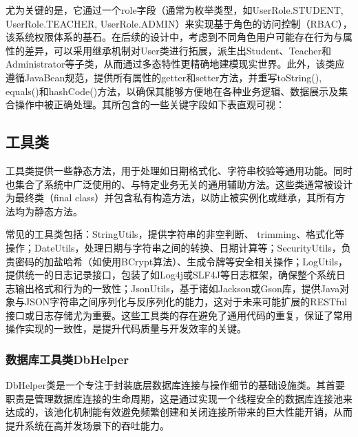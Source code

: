 尤为关键的是，它通过一个role字段（通常为枚举类型，如UserRole.STUDENT, UserRole.TEACHER, UserRole.ADMIN）来实现基于角色的访问控制（RBAC），该系统权限体系的基石。在后续的设计中，考虑到不同角色用户可能存在行为与属性的差异，可以采用继承机制对User类进行拓展，派生出Student、Teacher和Administrator等子类，从而通过多态特性更精确地建模现实世界。此外，该类应遵循JavaBean规范，提供所有属性的getter和setter方法，并重写toString(), equals()和hashCode()方法，以确保其能够方便地在各种业务逻辑、数据展示及集合操作中被正确处理。其所包含的一些关键字段如下表直观可视：
\begin{table}[H]
        \centering
\end{table}
\subsection{工具类}
工具类提供一些静态方法，用于处理如日期格式化、字符串校验等通用功能。同时也集合了系统中广泛使用的、与特定业务无关的通用辅助方法。这些类通常被设计为最终类（final class）并包含私有构造方法，以防止被实例化或继承，其所有方法均为静态方法。

常见的工具类包括：StringUtils，提供字符串的非空判断、 trimming、格式化等操作；DateUtils，处理日期与字符串之间的转换、日期计算等；SecurityUtils，负责密码的加盐哈希（如使用BCrypt算法）、生成令牌等安全相关操作；LogUtils，提供统一的日志记录接口，包装了如Log4j或SLF4J等日志框架，确保整个系统日志输出格式和行为的一致性；JsonUtils，基于诸如Jackson或Gson库，提供Java对象与JSON字符串之间序列化与反序列化的能力，这对于未来可能扩展的RESTful接口或日志存储尤为重要。这些工具类的存在避免了通用代码的重复，保证了常用操作实现的一致性，是提升代码质量与开发效率的关键。
\subsubsection{数据库工具类DbHelper}
DbHelper类是一个专注于封装底层数据库连接与操作细节的基础设施类。其首要职责是管理数据库连接的生命周期，这是通过实现一个线程安全的数据库连接池来达成的，该池化机制能有效避免频繁创建和关闭连接所带来的巨大性能开销，从而提升系统在高并发场景下的吞吐能力。

